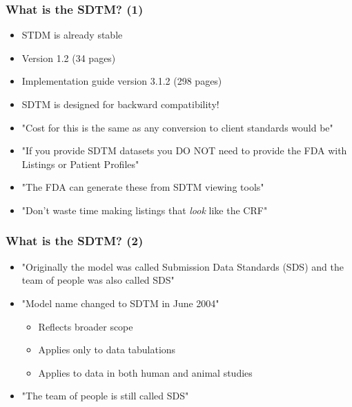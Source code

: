 \documentclass{beamer}
\begin{document}
\begin{frame}
  \frametitle{What is the SDTM? (1)}

  \begin{itemize}
  		\item STDM is already stable
  		\item Version 1.2 (34 pages)
  		\item Implementation guide version 3.1.2 (298 pages)
		\item SDTM is designed for backward compatibility!
		\item "Cost for this is the same as any conversion to client standards would be"
		\item "If you provide SDTM datasets you DO NOT need to provide the FDA with Listings or Patient Profiles"
		\item "The FDA can generate these from SDTM viewing tools"
		\item "Don't waste time making listings that \emph{look} like the CRF"
  \end{itemize}
\end{frame}

\begin{frame}
  \frametitle{What is the SDTM? (2)}

  \begin{itemize}
		\item "Originally the model was called Submission Data Standards (SDS) and the team of people 
		       was also called SDS"
		\item "Model name changed to SDTM in June 2004"
		  \begin{itemize}
				\item Reflects broader scope
				\item Applies only to data tabulations
				\item Applies to data in both human and animal studies
		  \end{itemize}
		\item "The team of people is still called SDS"
  \end{itemize}
\end{frame}

\end{document}
